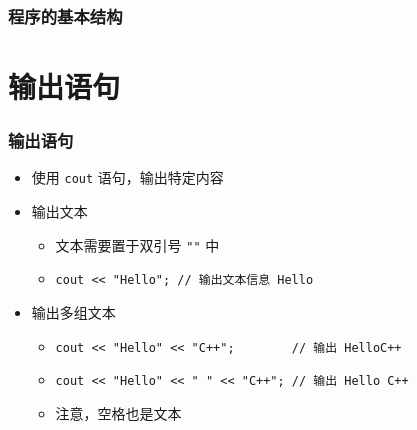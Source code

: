 \begin{frame}[fragile]
    \frametitle{程序的基本结构}

     {
        
    }{
        
    }
\end{frame}


\section{输出语句}

\begin{frame}[fragile]
    \frametitle{输出语句}

    \begin{itemize}
        \item<1-> 使用 \lstinline|cout| 语句，输出特定内容

        \item<2-> 输出文本

            \begin{itemize}
                \item 文本需要置于双引号 \lstinline|""| 中
                \item \lstinline|cout << "Hello"; // 输出文本信息 Hello| 
            \end{itemize}

        \item<3-> 输出多组文本

            \begin{itemize}
                \item \lstinline|cout << "Hello" << "C++";        // 输出 HelloC++| 
                \item \lstinline|cout << "Hello" << " " << "C++"; // 输出 Hello C++|
                \item 注意，空格也是文本
            \end{itemize}

    \end{itemize}
\end{frame}

